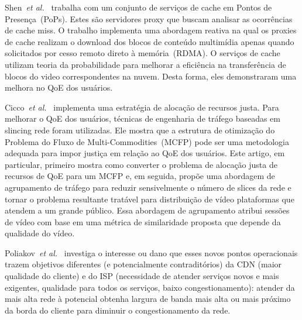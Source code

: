 Shen~\textit{et al.}~\cite{shenIWQoS19} trabalha com um conjunto de serviços de cache em Pontos de Presença~(PoPs). Estes são servidores proxy que buscam analisar as ocorrências de cache miss.
O trabalho implementa uma abordagem reativa na qual os proxies de cache realizam o download dos blocos de conteúdo multimídia apenas quando solicitados por cesso remoto direto à memória~(RDMA). 
O serviços de cache utilizam teoria da probabilidade 
para melhorar a eficiência na transferência de blocos do video correspondentes na nuvem. Desta forma, eles demonstraram uma melhora no QoE dos usuários.

Cicco~\textit{et al.}~\cite{cicco:2019:QRA} implementa uma estratégia de alocação de recursos justa. Para melhorar o QoE dos usuários, técnicas de engenharia de tráfego baseadas em slincing rede foram utilizadas. Ele mostra que a estrutura de otimização do Problema do Fluxo de Multi-Commodities~(MCFP) pode ser uma metodologia adequada para impor justiça em relação ao QoE dos usuários. Este artigo, em particular, primeiro mostra como converter o problema de alocação justa de recursos de QoE para um MCFP e, em seguida, propõe uma abordagem de agrupamento de tráfego para reduzir sensivelmente o número de slices da rede e tornar o problema resultante tratável para distribuição de vídeo plataformas que atendem a um grande público. Essa abordagem de agrupamento atribui sessões de vídeo com base em uma métrica de similaridade proposta que depende da qualidade do vídeo.


Poliakov~\textit{et al.}~\cite{poliakovPHD2018} 
investiga o interesse ou dano que esses novos pontos operacionais trazem objetivos diferentes (e potencialmente contraditórios) da CDN (maior qualidade do cliente) e do ISP (necessidade de atender serviços novos e mais exigentes, qualidade para todos os serviços, baixo congestionamento): atender da mais alta rede à potencial obtenha largura de banda mais alta ou mais próximo da borda do cliente para diminuir o congestionamento da rede.

